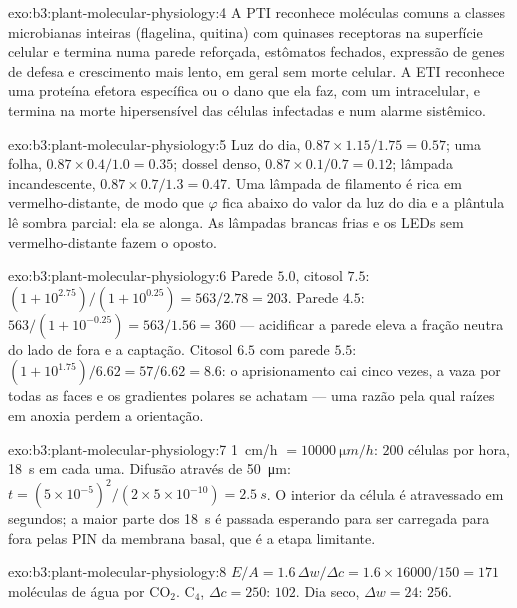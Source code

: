 \begin{solution}{exo:b3:plant-molecular-physiology:4}
A PTI reconhece moléculas comuns a classes microbianas inteiras
(flagelina, quitina) com quinases receptoras na superfície celular e
termina numa parede reforçada, estômatos fechados, expressão de genes de
defesa e crescimento mais lento, em geral sem morte celular. A ETI
reconhece uma proteína efetora específica ou o dano que ela faz, com um
 intracelular, e termina na morte hipersensível das células
infectadas e num alarme sistêmico.
\end{solution}

\begin{solution}{exo:b3:plant-molecular-physiology:5}
Luz do dia, $0.87\times 1.15/1.75 = 0.57$; uma folha, $0.87\times 0.4/1.0 =
0.35$; dossel denso, $0.87\times 0.1/0.7 = 0.12$; lâmpada
incandescente, $0.87\times 0.7/1.3 = 0.47$. Uma lâmpada de filamento é
rica em vermelho-distante, de modo que $\varphi$ fica abaixo do valor da
luz do dia e a plântula lê sombra parcial: ela se alonga. As lâmpadas
brancas frias e os LEDs sem vermelho-distante fazem o oposto.
\end{solution}

\begin{solution}{exo:b3:plant-molecular-physiology:6}
Parede $5.0$, citosol $7.5$: $(1 + 10^{2.75})/(1 + 10^{0.25}) = 563/2.78
= 203$. Parede $4.5$: $563/(1 + 10^{-0.25}) = 563/1.56 = 360$ ---
acidificar a parede eleva a fração neutra do lado de fora e a captação.
Citosol $6.5$ com parede $5.5$: $(1 + 10^{1.75})/6.62 = 57/6.62 = 8.6$: o
aprisionamento cai cinco vezes, a  vaza por todas as faces e os
gradientes polares se achatam --- uma razão pela qual raízes em anoxia
perdem a orientação.
\end{solution}

\begin{solution}{exo:b3:plant-molecular-physiology:7}
\qty{1}{cm/h} $= \qty{10000}{\micro m/h}$: $200$ células por hora,
\qty{18}{s} em cada uma. Difusão através de \qty{50}{\micro m}: $t =
(5\times 10^{-5})^{2}/(2\times 5\times 10^{-10}) = \qty{2.5}{s}$. O
interior da célula é atravessado em segundos; a maior parte dos
\qty{18}{s} é passada esperando para ser carregada para fora pelas PIN
da membrana basal, que é a etapa limitante.
\end{solution}

\begin{solution}{exo:b3:plant-molecular-physiology:8}
$E/A = 1.6\,\Delta w/\Delta c = 1.6\times\num{16000}/150 = 171$ moléculas
de água por CO$_{2}$. C$_{4}$, $\Delta c = 250$: $102$. Dia seco,
$\Delta w = 24$: $256$.
\end{solution}


